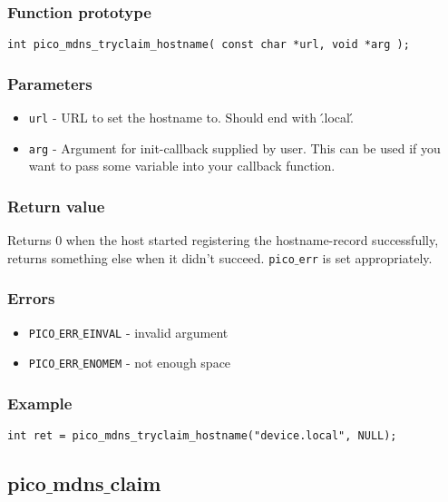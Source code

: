 \subsubsection*{Function prototype}
\begin{verbatim}
int pico_mdns_tryclaim_hostname( const char *url, void *arg );
\end{verbatim}

\subsubsection*{Parameters}
\begin{itemize}[noitemsep]
\item \texttt{url} - URL to set the hostname to. Should end with \'.local\'.
\item \texttt{arg} - Argument for init-callback supplied by user. This can be used if you want to pass some variable into your callback function.
\end{itemize}

\subsubsection*{Return value}
Returns 0 when the host started registering the hostname-record successfully, returns something else when it didn't succeed. \texttt{pico$\_$err} is set appropriately.

\subsubsection*{Errors}
\begin{itemize}[noitemsep]
\item \texttt{PICO$\_$ERR$\_$EINVAL} - invalid argument
\item \texttt{PICO$\_$ERR$\_$ENOMEM} - not enough space
\end{itemize}

\subsubsection*{Example}
\begin{verbatim}
int ret = pico_mdns_tryclaim_hostname("device.local", NULL);
\end{verbatim}


\subsection{pico$\_$mdns$\_$claim}

